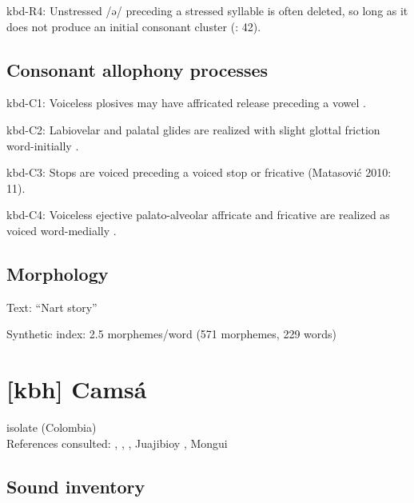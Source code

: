 {\begin{appendixdesc}
\item[kbd-R4:] Unstressed /ə/ preceding a stressed syllable is often deleted, so long as it does not produce an initial consonant cluster (\citealt{GordonApplebaum2010}: 42).
\end{appendixdesc}
\subsection*{Consonant allophony processes}
\begin{appendixdesc}

\item[kbd-C1:] Voiceless plosives may have affricated release preceding a vowel \citep[17]{Kuipers1960}.

\item[kbd-C2:] Labiovelar and palatal glides are realized with slight glottal friction word-initially \citep[22]{Kuipers1960}.

\item[kbd-C3:] Stops are voiced preceding a voiced stop or fricative (Matasović 2010: 11).

\item[kbd-C4:] Voiceless ejective palato-alveolar affricate and fricative are realized as voiced word-medially \citep[19]{Kuipers1960}.
\end{appendixdesc}
\subsection*{Morphology}

\begin{appendixdesc}

\item[Text:] “Nart story” \citep[223--231]{Applebaum2013}

\item[Synthetic index:] 2.5 morphemes/word (571 morphemes, 229 words)
\end{appendixdesc}
\section*{[kbh] Camsá}  %
isolate (Colombia)\medskip\\
References consulted: \citet{Fabre2002}, \citet{Howard1967}, \citet{Howard1972}, Juajibioy \citet{Chindoy1962}, Mongui \citet{Sánchez1981}

\subsection*{Sound inventory}
\begin{appendixdesc}


\end{appendixdesc}}
